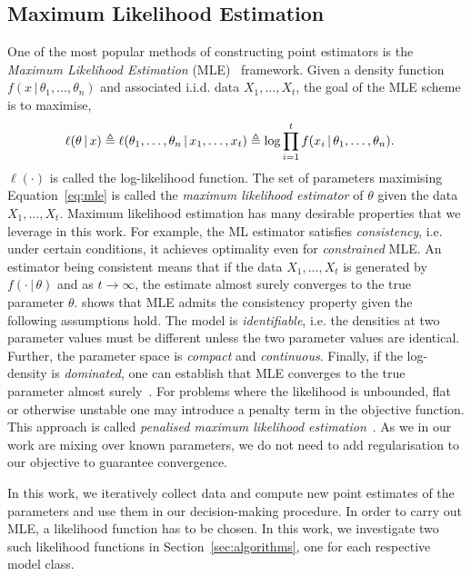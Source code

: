 \subsection{Maximum Likelihood Estimation}
One of the most popular methods of constructing point estimators is the \emph{Maximum Likelihood Estimation} (MLE)~\citep{casella2021statistical} framework. Given a density function $f(x \, | \, \theta_1, \hdots, \theta_n)$ and associated i.i.d. data $X_1, \hdots, X_t$, the goal of the MLE scheme is to maximise,
\begin{equation}\label{eq:mle}
\hspace*{-1em}  \ell(\theta \, | \, x) \triangleq \ell(\theta_1, \hdots, \theta_n \, | \, x_1, \hdots, x_t) \triangleq \log \prod_{i=1}^t f(x_i \, | \, \theta_1, \hdots, \theta_n).
\end{equation}
$\ell(\cdot)$ is called the log-likelihood function. The set of parameters maximising Equation~\ref{eq:mle} is called the \emph{maximum likelihood estimator} of $\theta$ given the data $X_1, \hdots, X_t$. Maximum likelihood estimation has many desirable properties that we leverage in this work. For example, the ML estimator satisfies \emph{consistency}, i.e. under certain conditions, it achieves optimality even for \emph{constrained} MLE. An estimator being consistent means that if the data $X_1, \hdots, X_t$ is generated by $f(\cdot \, | \, \theta)$ and as $t\rightarrow \infty$, the estimate almost surely converges to the true parameter $\theta$. \citep{kiefer1956consistency} shows that MLE admits the consistency property given the following assumptions hold. The model is \emph{identifiable}, i.e. the densities at two parameter values must be different unless the two parameter values are identical. Further, the parameter space is \emph{compact} and \emph{continuous}. Finally, if the log-density is \emph{dominated}, one can establish that MLE converges to the true parameter almost surely~\citep{newey1987asymmetric}.
For problems where the likelihood is unbounded, flat or otherwise unstable one may introduce a penalty term in the objective function. This approach is called \emph{penalised maximum likelihood estimation}~\citep{ciuperca2003penalized, ouhamma2023bilinear}. As we in our work are mixing over known parameters, we do not need to add regularisation to our objective to guarantee convergence.

In this work, we iteratively collect data and compute new point estimates of the parameters and use them in our decision-making procedure. In order to carry out MLE, a likelihood function has to be chosen. In this work, we investigate two such likelihood functions in Section~\ref{sec:algorithms}, one for each respective model class. 